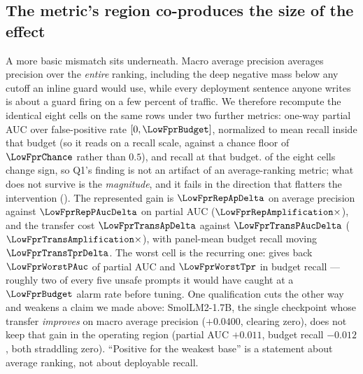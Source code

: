 \documentclass[manuscript,screen,review,anonymous]{acmart}
\begin{document}
\subsection{The metric's region co-produces the size of the effect}
\label{sec:region}

A more basic mismatch sits underneath. Macro average precision averages precision over the
\emph{entire} ranking, including the deep negative mass below any cutoff an inline guard would use,
while every deployment sentence anyone writes is about a guard firing on a few percent of traffic. We
therefore recompute the identical eight cells on the same rows under two further metrics: one-way
partial AUC over false-positive rate $[0,\LowFprBudget]$, normalized to mean recall inside that budget
(so it reads on a recall scale, against a chance floor of $\LowFprChance$ rather than $0.5$), and
recall at that budget. \LowFprSignFlips{} of the eight cells change sign, so Q1's finding is not an
artifact of an average-ranking metric; what does not survive is the \emph{magnitude}, and it fails in the
direction that flatters the intervention (). The represented gain is
$\LowFprRepApDelta$ on average precision against $\LowFprRepPAucDelta$ on partial AUC
($\LowFprRepAmplification\times$), and the transfer cost $\LowFprTransApDelta$ against
$\LowFprTransPAucDelta$ ($\LowFprTransAmplification\times$), with panel-mean budget recall moving
$\LowFprTransTprDelta$. The worst cell is the recurring one: \LowFprWorstName{} gives back
$\LowFprWorstPAuc$ \LowFprWorstPAucCI{} of partial AUC and $\LowFprWorstTpr$ in budget recall ---
roughly two of every five unsafe prompts it would have caught at a $\LowFprBudget$ alarm rate before
tuning. One qualification cuts the other way and weakens a claim we made above: SmolLM2-1.7B, the
single checkpoint whose transfer \emph{improves} on macro average precision ($+0.0400$, clearing
zero), does not keep that gain in the operating region (partial AUC $+0.011$, budget recall $-0.012$,
both straddling zero). ``Positive for the weakest base'' is a statement about average ranking, not
about deployable recall.
\end{document}
